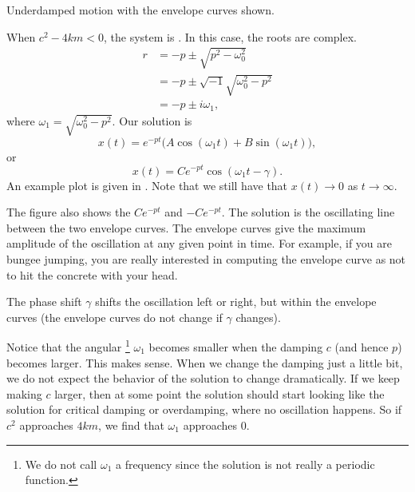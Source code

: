 \begin{mywrapfig}[13]{3.25in}
\capstart
{}
\caption{Underdamped motion with the envelope curves shown.\label{mv:underdampedfig}}
\end{mywrapfig}
%
%
When
$c^2 - 4km < 0$, the system is \emph{}.  In this case,
the roots are complex.
\begin{equation*}
\begin{split}
r & =
-p \pm \sqrt{p^2 - \omega_0^2} \\
& = 
-p \pm \sqrt{-1}\sqrt{\omega_0^2 - p^2} \\
& = 
-p \pm i \omega_1 ,
\end{split}
\end{equation*}
where $\omega_1 =\sqrt{\omega_0^2 - p^2}$.  Our solution is
\begin{equation*}
x(t) = e^{-pt} \bigl( A \cos (\omega_1 t) + B \sin (\omega_1 t) \bigr) ,
\end{equation*}
or
\begin{equation*}
x(t) = C e^{-pt} \cos ( \omega_1 t - \gamma ) .
\end{equation*}
An example plot is given in .  Note that we
still have that $x(t) \to 0$ as $t \to \infty$.


The figure also 
shows the \emph{}
$C e^{-pt}$ and $-C e^{-pt}$.  The solution
is the oscillating line between the two envelope curves.
The envelope curves give
the maximum amplitude of the oscillation at any given point in time.  For
example, if you are bungee jumping, you are really interested in computing the
envelope curve as not to hit the concrete with your head.

The phase shift $\gamma$ shifts the oscillation left or right, but within the
envelope curves (the envelope curves do not change if $\gamma$
changes).


Notice that the angular
\emph{}\footnote{We do not call $\omega_1$ a frequency
since the solution is not really a periodic function.} $\omega_1$ becomes
smaller when the damping $c$ (and hence $p$) becomes larger.  This makes sense.
When we change the damping just a little bit, we do not
expect the behavior of the solution to change dramatically.
If we keep making $c$ larger, then
at some point the solution should start looking 
like the solution for critical damping or overdamping, where no oscillation
happens.  So if $c^2$ approaches $4km$, we find that $\omega_1$ approaches
$0$.

